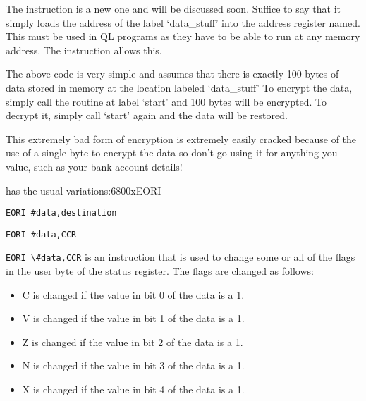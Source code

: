 The  instruction is a new one and will be discussed soon. Suffice
    to say that it simply loads the address of the label `data\_stuff' into the
    address register named. This must be used in QL programs as they have to
    be able to run at any memory address. The  instruction allows
    this.

The above code is very simple and assumes that there is exactly 100
    bytes of data stored in memory at the location labeled `data\_stuff' To
    encrypt the data, simply call the routine at label `start' and 100 bytes
    will be encrypted. To decrypt it, simply call `start' again and the data
    will be restored. 

\begin{warning}This extremely bad form of encryption is extremely easily cracked because of the use of a single
    byte to encrypt the data so don't go using it for anything you value, such as your bank account details!
\end{warning}

 has the usual variations:\mc6800x{EORI}

\begin{lstlisting}[firstnumber=1,]
          EORI #data,destination
\end{lstlisting}


\begin{lstlisting}[firstnumber=1,]
          EORI #data,CCR
\end{lstlisting}

\lstinline{EORI \#data,CCR} is an instruction that is used to change some or all
    of the flags in the user byte of the status register. The flags are
    changed as follows:
\begin{itemize}[itemsep=0pt]

\item{}C is changed if the value in bit 0 of the data is a 1.


\item{}V is changed if the value in bit 1 of the data is a 1.


\item{}Z is changed if the value in bit 2 of the data is a 1.


\item{}N is changed if the value in bit 3 of the data is a 1.


\item{}X is changed if the value in bit 4 of the data is a 1.

\end{itemize}


